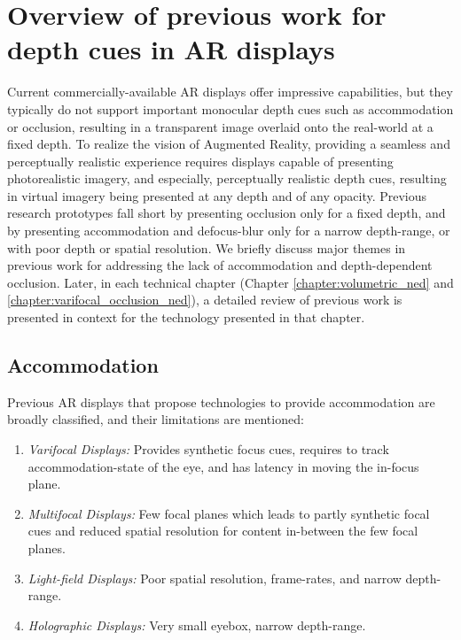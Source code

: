 \section{Overview of previous work for depth cues in AR displays}
\label{sec:background:previous_work_ar}
Current commercially-available AR displays offer impressive capabilities, but they typically do not support important monocular depth cues such as accommodation or occlusion, resulting in a transparent image overlaid onto the real-world at a fixed depth. 
To realize the vision of Augmented Reality, providing a seamless and perceptually realistic experience requires displays capable of presenting photorealistic imagery, and especially, perceptually realistic depth cues, resulting in virtual imagery being presented at any depth and of any opacity. 
Previous research prototypes fall short by presenting occlusion only for a fixed depth, and by presenting accommodation and defocus-blur only for a narrow depth-range, or with poor depth or spatial resolution. 
We briefly discuss major themes in previous work for addressing the lack of accommodation and depth-dependent occlusion. 
Later, in each technical chapter (Chapter \ref{chapter:volumetric_ned} and \ref{chapter:varifocal_occlusion_ned}), a detailed review of previous work is presented in context for the technology presented in that chapter.

\subsection{Accommodation}

Previous AR displays that propose technologies to provide accommodation are broadly classified, and their limitations are mentioned:

\begin{enumerate}
    \item \emph{Varifocal Displays:} \cite{Dunn2017Wide,Aksit2017Near} Provides synthetic focus cues, requires to track accommodation-state of the eye, and has latency in moving the in-focus plane.
    \item \emph{Multifocal Displays:} \cite{Akeley2004,Narain2015optimal} Few focal planes which leads to partly synthetic focal cues and reduced spatial resolution for content in-between the few focal planes.
    \item \emph{Light-field Displays:} \cite{Maimone2014Pinlight} Poor spatial resolution, frame-rates, and narrow depth-range. 
    \item \emph{Holographic Displays:} \cite{Maimone2017Holographic} Very small eyebox, narrow depth-range.
\end{enumerate}

